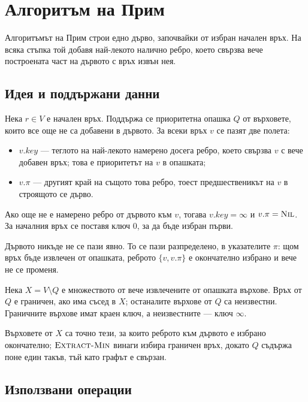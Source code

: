 \section{Алгоритъм на Прим}\label{s:7.3}

Алгоритъмът на Прим строи едно дърво, започвайки от избран начален връх. На всяка стъпка той добавя най-лекото налично ребро, което свързва вече построената част на дървото с връх извън нея.

\subsection{Идея и поддържани данни}\label{s:7.3.1}

Нека $r\in V$ е начален връх. Поддържа се приоритетна опашка $Q$ от върховете, които все още не са добавени в дървото. За всеки връх $v$ се пазят две полета:

\begin{itemize}
\item $v.\mathit{key}$ --- теглото на най-лекото намерено досега ребро, което свързва $v$ с вече добавен връх; това е приоритетът на $v$ в опашката;
\item $v.\pi$ --- другият край на същото това ребро, тоест предшественикът на $v$ в строящото се дърво.
\end{itemize}

Ако още не е намерено ребро от дървото към $v$, тогава $v.\mathit{key}=\infty$ и $v.\pi=\textsc{Nil}$. За началния връх се поставя ключ $0$, за да бъде избран първи.

Дървото никъде не се пази явно. То се пази разпределено, в указателите $\pi$: щом връх бъде извлечен от опашката, реброто $\{v,v.\pi\}$ е окончателно избрано и вече не се променя.

\begin{keydefn}
Нека $X=V\setminus Q$ е множеството от вече извлечените от опашката върхове. Връх от $Q$ е граничен, ако има съсед в $X$; останалите върхове от $Q$ са неизвестни. Граничните върхове имат краен ключ, а неизвестните --- ключ $\infty$.
\end{keydefn}

Върховете от $X$ са точно тези, за които реброто към дървото е избрано окончателно; $\textsc{Extract-Min}$ винаги избира граничен връх, докато $Q$ съдържа поне един такъв, тъй като графът е свързан.

\subsection{Използвани операции}\label{s:7.3.2}


